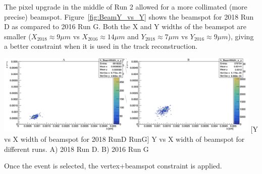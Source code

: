 The pixel upgrade in the middle of Run 2 allowed for a more collimated (more precise) \pp beamspot.
Figure~\ref{fig:BeamY_vs_Y} shows the beamspot for 2018 Run D as compared to 2016 Run G.
Both the X and Y widths of the beamspot are smaller ($X_{2018} \approx 9 \mu m$ vs $X_{2016} \approx 14 \mu m$ and $Y_{2018} \approx 7 \mu m$ vs $Y_{2016} \approx 9 \mu m$), giving a better constraint when it is used in the track reconstruction.
\begin{multiFigure}
\begin{center}
	\includegraphics[width=0.96\textwidth]{figures/higgsmassmeas/vxbs/beamspot_width_2016RunG_vs_2018RunD.png}
        [Y vs X width of beamspot for 2018 RunD  RunG]
        {Y vs X width of beamspot for different runs.
        \;A) 2018 Run D.
        \;B) 2016 Run G
        }
\label{fig:BeamY_vs_Y}
\end{center}
\end{multiFigure}
Once the event is selected, the vertex+beamspot constraint is applied.

